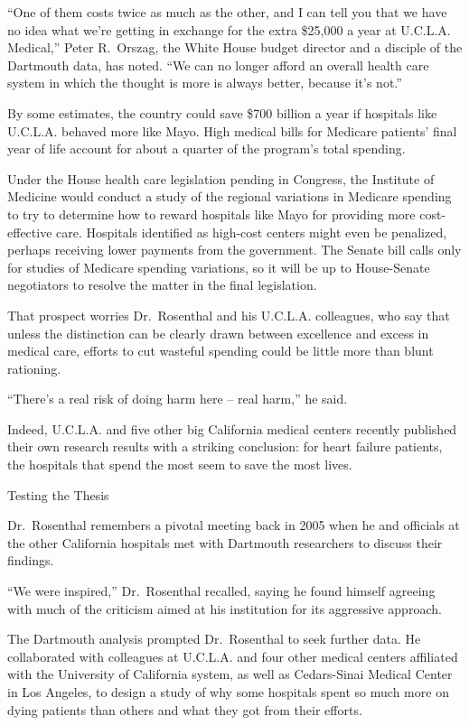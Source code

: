 ﻿\documentclass[12pt]{article}
\begin{document}
``One of them costs twice as much as the other, and I can tell you that we have no idea what we're
getting in exchange for the extra \$25,000 a year at U.C.L.A. Medical,'' Peter R.~Orszag, the White
House budget director and a disciple of the Dartmouth data, has noted. ``We can no longer afford an
overall health care system in which the thought is more is always better, because it's not.''

By some estimates, the country could save \$700 billion a year if hospitals like U.C.L.A. behaved
more like Mayo. High medical bills for Medicare patients' final year of life account for about a
quarter of the program's total spending.

Under the House health care legislation pending in Congress, the Institute of Medicine would conduct
a study of the regional variations in Medicare spending to try to determine how to reward hospitals
like Mayo for providing more cost-effective care. Hospitals identified as high-cost centers might
even be penalized, perhaps receiving lower payments from the government. The Senate bill calls only
for studies of Medicare spending variations, so it will be up to House-Senate negotiators to resolve
the matter in the final legislation.

That prospect worries Dr.~Rosenthal and his U.C.L.A. colleagues, who say that unless the distinction
can be clearly drawn between excellence and excess in medical care, efforts to cut wasteful spending
could be little more than blunt rationing.

``There's a real risk of doing harm here -- real harm,'' he said.

Indeed, U.C.L.A. and five other big California medical centers recently published their own research
results with a striking conclusion: for heart failure patients, the hospitals that spend the most
seem to save the most lives.

Testing the Thesis

Dr.~Rosenthal remembers a pivotal meeting back in 2005 when he and officials at the other California
hospitals met with Dartmouth researchers to discuss their findings.

``We were inspired,'' Dr.~Rosenthal recalled, saying he found himself agreeing with much of the
criticism aimed at his institution for its aggressive approach.

The Dartmouth analysis prompted Dr.~Rosenthal to seek further data. He collaborated with colleagues
at U.C.L.A. and four other medical centers affiliated with the University of California system, as
well as Cedars-Sinai Medical Center in Los Angeles, to design a study of why some hospitals spent so
much more on dying patients than others and what they got from their efforts.
\end{document}
